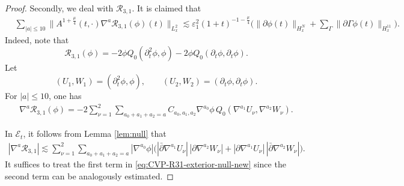 \documentclass[11pt,twoside]{article}
\def\p{\partial}
\def\ve{\varepsilon}
\def\ls{\lesssim}
\theoremstyle{plain}
\theoremstyle{definition}
\theoremstyle{assumption}
\numberwithin{equation}{section}
\begin{document}
\begin{proof}
		
		
		Secondly, we deal with \(\mathcal R_{3,1}\). It is claimed that
		\begin{equation}
			\label{eq:CVP-R31-time-estimate-new}
			\begin{aligned}
				&
				\sum_{|a|\le 10}
				\big\|
				A^{1+\frac{\mu}{4}}(t,\cdot)
				\nabla^a\mathcal R_{3,1}(\phi)(t)
				\big\|_{L^2_x}
				\ls
				\ve_1^2
				(1+t)^{-1-\frac{\mu}{4}}
				\big(
				\|\p\phi(t)\|_{H^N_x}
				+\sum_{\Gamma}
				\|\p\Gamma\phi(t)\|_{H^{11}_x}
				\big).
			\end{aligned}
		\end{equation}
		Indeed, note that
		\begin{equation}
			\label{eq:CVP-R31-expanded-new}
			\mathcal R_{3,1}(\phi)
			=-2\phi Q_0(\p_t^2\phi,\phi)
			-2\phi Q_0(\p_t\phi,\p_t\phi).
		\end{equation}
		Let
		\[
		(U_1,W_1)=(\p_t^2\phi,\phi),
		\qquad
		(U_2,W_2)=(\p_t\phi,\p_t\phi).
		\]
		For \(|a|\le 10\), one has
		\begin{equation}
			\label{eq:CVP-R31-Leibniz-new}
			\begin{aligned}
				\nabla^a\mathcal R_{3,1}(\phi)
				=-2\sum_{\nu=1}^{2}
				\sum_{a_0+a_1+a_2=a}
				C_{a_0,a_1,a_2}
				\nabla^{a_0}\phi\,
				Q_0(\nabla^{a_1}U_\nu,\nabla^{a_2}W_\nu).
			\end{aligned}
		\end{equation}
		
		In $\mathcal{E}_t$, it follows from Lemma \ref{lem:null} that
		\begin{equation}\label{eq:CVP-R31-exterior-null-new}
			\begin{aligned}
				|\nabla^a\mathcal R_{3,1}|
				\ls
				\sum_{\nu=1}^2
				\sum_{a_0+a_1+a_2=a}
				|\nabla^{a_0}\phi|
				\big(
				|\bar\p\nabla^{a_1}U_\nu|\,
				|\p\nabla^{a_2}W_\nu|
				+
				|\p\nabla^{a_1}U_\nu|\,
				|\bar\p\nabla^{a_2}W_\nu|
				\big).
			\end{aligned}
		\end{equation}
		It suffices to treat the first term in \eqref{eq:CVP-R31-exterior-null-new} since the second term can be analogously estimated.
		

\end{proof}
\end{document}
